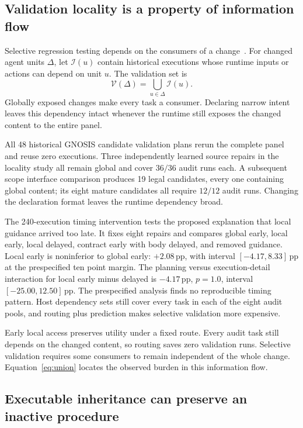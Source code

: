 \documentclass{ecai}
\newcommand{\pp}{\,\mathrm{pp}}
\begin{document}
\subsection{Validation locality is a property of information flow}

Selective regression testing depends on the consumers of a change~\cite{ekstazi}. For changed agent units $\Delta$, let $\mathcal I(u)$ contain historical executions whose runtime inputs or actions can depend on unit $u$. The validation set is
\begin{equation}
\mathcal V(\Delta)=\bigcup_{u\in\Delta}\mathcal I(u).
\label{eq:union}
\end{equation}
Globally exposed changes make every task a consumer. Declaring narrow intent leaves this dependency intact whenever the runtime still exposes the changed content to the entire panel.

All 48 historical GNOSIS candidate validation plans rerun the complete panel and reuse zero executions. Three independently learned source repairs in the locality study all remain global and cover $36/36$ audit runs each. A subsequent scope interface comparison produces 19 legal candidates, every one containing global content; its eight mature candidates all require $12/12$ audit runs. Changing the declaration format leaves the runtime dependency broad.

The 240-execution timing intervention tests the proposed explanation that local guidance arrived too late. It fixes eight repairs and compares global early, local early, local delayed, contract early with body delayed, and removed guidance. Local early is noninferior to global early: $+2.08\pp$, with interval $[-4.17,8.33]\pp$ at the prespecified ten point margin. The planning versus execution-detail interaction for local early minus delayed is $-4.17\pp$, $p=1.0$, interval $[-25.00,12.50]\pp$. The prespecified analysis finds no reproducible timing pattern. Host dependency sets still cover every task in each of the eight audit pools, and routing plus prediction makes selective validation more expensive.

Early local access preserves utility under a fixed route. Every audit task still depends on the changed content, so routing saves zero validation runs. Selective validation requires some consumers to remain independent of the whole change. Equation~\eqref{eq:union} locates the observed burden in this information flow.

\subsection{Executable inheritance can preserve an inactive procedure}
\end{document}
